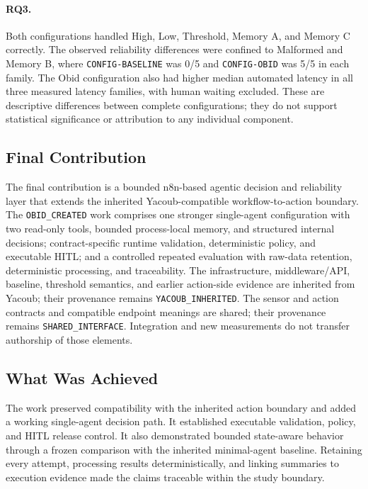 \paragraph{RQ3.}
Both configurations handled High, Low, Threshold, Memory A, and Memory C
correctly. The observed reliability differences were confined to Malformed and
Memory B, where \texttt{CONFIG-BASELINE} was 0/5 and \texttt{CONFIG-OBID} was
5/5 in each family. The Obid configuration also had higher median automated
latency in all three measured latency families, with human waiting excluded.
These are descriptive differences between complete configurations; they do not
support statistical significance or attribution to any individual component.

\subsection{Final Contribution}\label{subsec:conclusions-contribution}

The final contribution is a bounded n8n-based agentic decision and reliability
layer that extends the inherited Yacoub-compatible workflow-to-action boundary.
The \texttt{OBID\_CREATED} work comprises one stronger single-agent
configuration with two read-only tools, bounded process-local memory, and
structured internal decisions; contract-specific runtime validation,
deterministic policy, and executable HITL; and a controlled repeated evaluation
with raw-data retention, deterministic processing, and traceability. The
infrastructure, middleware/API, baseline, threshold semantics, and earlier
action-side evidence are inherited from Yacoub; their provenance remains
\texttt{YACOUB\_INHERITED}. The sensor and action contracts and compatible
endpoint meanings are shared; their provenance remains
\texttt{SHARED\_INTERFACE}.
Integration and new measurements do not transfer authorship of those elements.

\subsection{What Was Achieved}\label{subsec:conclusions-achieved}

The work preserved compatibility with the inherited action boundary and added a
working single-agent decision path. It established executable validation,
policy, and HITL release control. It also demonstrated bounded state-aware
behavior through a frozen comparison with the inherited minimal-agent baseline.
Retaining every attempt, processing results deterministically, and linking
summaries to execution evidence made the claims traceable within the study
boundary.

